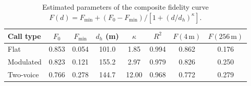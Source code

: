 \begin{table}[!ht]
\centering
\caption{Estimated parameters of the composite fidelity curve $F(d)=F_{\min}+(F_0-F_{\min})/[1+(d/d_h)^{\kappa}]$.}
\label{tab:p2params}
\small
\begin{tabular}{lccccccc}
\toprule
Call type & $F_0$ & $F_{\min}$ & $d_h$ (m) & $\kappa$ & $R^2$ & $F(4\,\mathrm{m})$ & $F(256\,\mathrm{m})$ \\
\midrule
Flat & 0.853 & 0.054 & 101.0 & 1.85 & 0.994 & 0.862 & 0.176 \\
Modulated & 0.823 & 0.121 & 155.2 & 2.97 & 0.979 & 0.826 & 0.250 \\
Two-voice & 0.766 & 0.278 & 144.7 & 12.00 & 0.968 & 0.772 & 0.279 \\
\bottomrule
\end{tabular}
\end{table}